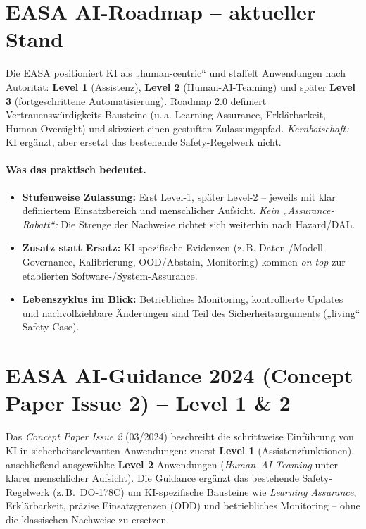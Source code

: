 \section{EASA AI-Roadmap – aktueller Stand}
Die EASA positioniert KI als „human-centric“ und staffelt Anwendungen nach Autorität: \textbf{Level 1} (Assistenz), 
\textbf{Level 2} (Human-AI-Teaming) und später \textbf{Level 3} (fortgeschrittene Automatisierung). 
Roadmap 2.0 definiert Vertrauenswürdigkeits-Bausteine (u.\,a. Learning Assurance, Erklärbarkeit, Human Oversight) 
und skizziert einen gestuften Zulassungspfad. \emph{Kernbotschaft:} KI ergänzt, aber ersetzt das bestehende Safety-Regelwerk nicht.
\paragraph{Was das praktisch bedeutet.}
\begin{itemize}
  \item \textbf{Stufenweise Zulassung:} Erst Level-1, später Level-2 – jeweils mit klar definiertem Einsatzbereich und menschlicher Aufsicht. \emph{Kein „Assurance-Rabatt“:} Die Strenge der Nachweise richtet sich weiterhin nach Hazard/DAL.
  \item \textbf{Zusatz statt Ersatz:} KI-spezifische Evidenzen (z.\,B. Daten-/Modell-Governance, Kalibrierung, OOD/Abstain, Monitoring) kommen \emph{on top} zur etablierten Software-/System-Assurance.
  \item \textbf{Lebenszyklus im Blick:} Betriebliches Monitoring, kontrollierte Updates und nachvollziehbare Änderungen sind Teil des Sicherheitsarguments („living“ Safety Case).
\end{itemize}


\section{EASA AI-Guidance 2024 (Concept Paper Issue 2) – Level 1 \& 2}
Das \emph{Concept Paper Issue 2} (03/2024) beschreibt die schrittweise Einführung von KI in sicherheitsrelevanten Anwendungen: zuerst \textbf{Level 1} (Assistenzfunktionen), anschließend ausgewählte \textbf{Level 2}-Anwendungen (\emph{Human–AI Teaming} unter klarer menschlicher Aufsicht). Die Guidance ergänzt das bestehende Safety-Regelwerk (z.\,B.\ DO-178C) um KI-spezifische Bausteine wie \emph{Learning Assurance}, Erklärbarkeit, präzise Einsatzgrenzen (ODD) und betriebliches Monitoring – ohne die klassischen Nachweise zu ersetzen.

